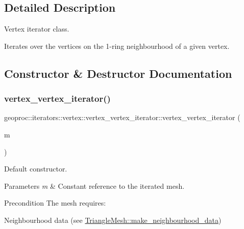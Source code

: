 \subsection{Detailed Description}
Vertex iterator class. 

Iterates over the vertices on the 1-\/ring neighbourhood of a given vertex. 

\subsection{Constructor \& Destructor Documentation}
\mbox{\label{classgeoproc_1_1iterators_1_1vertex_1_1vertex__vertex__iterator_a6132b060a09bd87279957cc9744cd9af}} 
\subsubsection{\texorpdfstring{vertex\+\_\+vertex\+\_\+iterator()}{vertex\_vertex\_iterator()}}
{\footnotesize\ttfamily geoproc\+::iterators\+::vertex\+::vertex\+\_\+vertex\+\_\+iterator\+::vertex\+\_\+vertex\+\_\+iterator (\begin{DoxyParamCaption}\item[{const \hyperlink{classgeoproc_1_1TriangleMesh}{Triangle\+Mesh} \&}]{m }\end{DoxyParamCaption})}



Default constructor. 


\begin{DoxyParams}{Parameters}
{\em m} & Constant reference to the iterated mesh. \\
\hline
\end{DoxyParams}
\begin{DoxyPrecond}{Precondition}
The mesh requires\+:
\begin{DoxyItemize}
\item Neighbourhood data (see \hyperlink{classgeoproc_1_1TriangleMesh_a84003dfdfd5e591c00f01a797578ff1f}{Triangle\+Mesh\+::make\+\_\+neighbourhood\+\_\+data}) 
\end{DoxyItemize}
\end{DoxyPrecond}



